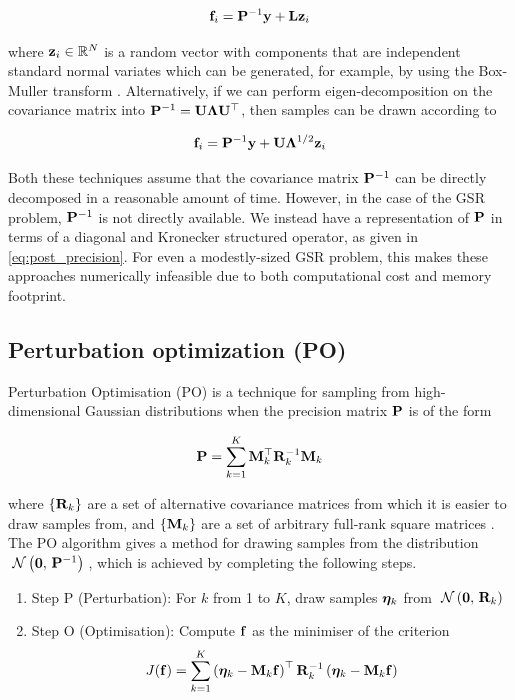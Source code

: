 \begin{equation}
    \label{eq:post_precision}
    \mathbf{f}_i = \mathbf{P}^{-1} \mathbf{y} + \mathbf{L} \mathbf{z}_i
\end{equation}

where $\mathbf{z}_i \in \mathbb{R}^N$ is a random vector with components that are independent standard normal variates which can be generated, for example, by using the Box-Muller transform \citep{Box1958}. Alternatively, if we can perform eigen-decomposition on the covariance matrix into $\mathbf{P}^{-1} = \mathbf{U} \mathbf{\Lambda} \mathbf{U}^\top$, then samples can be drawn according to

\begin{equation}
    \mathbf{f}_i = \mathbf{P}^{-1} \mathbf{y} + \mathbf{U} \mathbf{\Lambda}^{1/2} \mathbf{z}_i
\end{equation}

Both these techniques assume that the covariance matrix $\mathbf{P}^{-1}$ can be directly decomposed in a reasonable amount of time. However, in the case of the GSR problem, $\mathbf{P}^{-1}$ is not directly available. We instead have a representation of $\mathbf{P}$ in terms of a diagonal and Kronecker structured operator, as given in \cref{eq:post_precision}. For even a modestly-sized GSR problem, this makes these approaches numerically infeasible due to both computational cost and memory footprint. 

\subsection{Perturbation optimization (PO)}

\label{sec:PO}

Perturbation Optimisation (PO) is a technique for sampling from high-dimensional Gaussian distributions when the precision matrix $\mathbf{P}$ is of the form 

\begin{equation}
    \label{eq:PO_sum}
    \mathbf{P} = \sum_{k=1}^K \mathbf{M}_k^\top \mathbf{R}_k^{-1} \mathbf{M}_k
\end{equation}

where $\left\{\mathbf{R}_k\right\}$ are a set of alternative covariance matrices from which it is easier to draw samples from, and $\left\{\mathbf{M}_k\right\}$ are a set of arbitrary full-rank square matrices \citep{Papandreou2010, Orieux2012}. The PO algorithm gives a method for drawing samples from the distribution $\; \mathcal{N}\left(\mathbf{0}, \, \mathbf{P}^{-1}\right) \;$, which is achieved by completing the following steps. 

\begin{enumerate}
    \item Step P (Perturbation): For $k$ from 1 to $K$, draw samples $\boldsymbol{\eta}_k$ from $\; \mathcal{N}\left(\mathbf{0}, \, \mathbf{R}_k\right) \;$
    \item Step O (Optimisation): Compute $\mathbf{f}$ as the minimiser of the criterion $$J(\mathbf{f}) = \sum_{k=1}^K \left(\boldsymbol{\eta}_k - \mathbf{M}_k \mathbf{f} \right)^\top \mathbf{R}_k^{-1}\left(\boldsymbol{\eta}_k - \mathbf{M}_k \mathbf{f} \right)$$
\end{enumerate}
 
